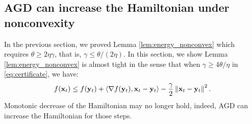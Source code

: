 

\subsection{AGD can increase the Hamiltonian under nonconvexity}
\label{sec:counterex}
In the previous section, we proved Lemma \ref{lem:energy_nonconvex} which requires $\theta \ge 2\eta\gamma$, that is, $\gamma \le \theta/(2\eta)$.
In this section, we show Lemma \ref{lem:energy_nonconvex} is almost tight in the sense 
that when $\gamma \ge 4\theta/\eta$ in \eqref{eq:certificate}, we have:
\begin{equation*}
f(\mathbf{x}_t) \le  f(\mathbf{y}_t) + \langle \nabla f(\mathbf{y}_t), \mathbf{x}_t - \mathbf{y}_t \rangle - \frac{\gamma}{2} \left\|{\mathbf{x}_t - \mathbf{y}_t}\right\|^2.
\end{equation*}
Monotonic decrease of the Hamiltonian may no longer hold, indeed, AGD can increase the Hamiltonian for those steps.

